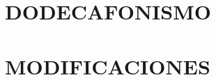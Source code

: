 \documentclass[twoside]{book}
\begin{document}
	
    
    
	
	
    \part{DODECAFONISMO}
    
	
    
    
    
    \part{MODIFICACIONES}
	
	
    
    
    
	\cleardoublepage
    
	

	\cleardoublepage
    
\end{document}
